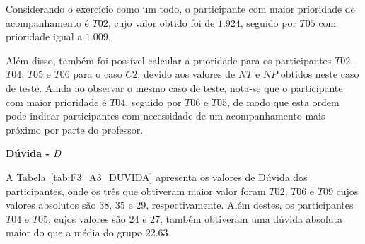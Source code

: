 Considerando o exercício como um todo, o participante com maior prioridade de acompanhamento é $T02$, cujo valor obtido foi de $1.924$, seguido por $T05$ com prioridade igual a $1.009$.

Além disso, também foi possível calcular a prioridade para os participantes $T02$, $T04$, $T05$ e $T06$ para o caso $C2$, devido aos valores de $NT$ e $NP$ obtidos neste caso de teste. Ainda ao observar o mesmo caso de teste, nota-se que o participante com maior prioridade é $T04$, seguido por $T06$ e $T05$, de modo que esta ordem pode indicar participantes com necessidade de um acompanhamento mais próximo por parte do professor.

\textbf{Dúvida - $D$}

A Tabela~\ref{tab:F3_A3_DUVIDA} apresenta os valores de Dúvida dos participantes, onde os três que obtiveram maior valor foram $T02$, $T06$ e $T09$ cujos valores absolutos são $38$, $35$ e $29$, respectivamente. Além destes, os participantes $T04$ e $T05$, cujos valores são $24$ e $27$, também obtiveram uma dúvida absoluta maior do que a média do grupo $22.63$.

